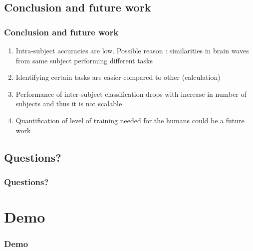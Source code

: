 \documentclass[unknownkeysallowed]{beamer}
\begin{document}
\subsection{Conclusion and future work}
\begin{frame}
	\frametitle{Conclusion and future work}
    \begin{enumerate}
    \item Intra-subject accuracies are low. Possible reason : similarities in brain waves from same subject performing different tasks
    \pause
    \item Identifying certain tasks are easier compared to other (calculation)
    \pause
    \item Performance of inter-subject classification drops with increase in number of subjects and thus it is not scalable
    \pause
    \item Quantification of level of training needed for the humans could be a future work
    \end{enumerate}
\end{frame}

\subsection{Questions?}
\begin{frame}
	\frametitle{Questions?}
\end{frame}

\section{Demo}
\begin{frame}
	\frametitle{Demo}
\end{frame}
\end{document}
